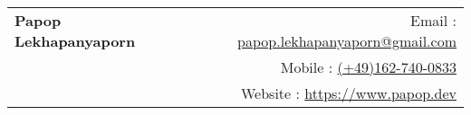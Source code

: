 \documentclass[12pt]{article}
\makeatletter
\newcommand{\heading}{\begin{tabular*}{\textwidth}{l@{\extracolsep{\fill}}r}
  \textbf{\sffamily\Huge Papop Lekhapanyaporn} & Email : \href{mailto:papop.lekhapanyaporn@gmail.com}{papop.lekhapanyaporn@gmail.com}\\
  \smallskip{\large{}} & Mobile : \href{tel:+491627400833}{(+49)162-740-0833} \\
  &Website : \href{https://papop.dev/}{https://www.papop.dev}
\end{tabular*}}
\newcommand{\coverletter}[3]{
  
  \section{}
  \textbf{Bewerbung als #1 an der #2}\\
  
  #3
  \vspace*{\fill}
}
\makeatother
\begin{document}
\heading

\newpage

%   
\end{document}
